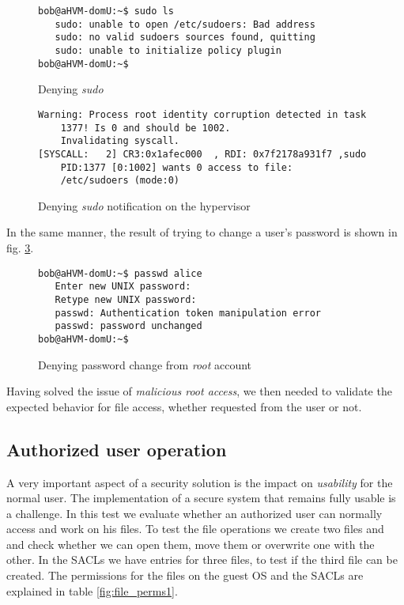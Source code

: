 \begin{figure}[ht]
	\centering
	\footnotesize{\selectfont 
		\begin{lstlisting}
bob@aHVM-domU:~$ sudo ls
   sudo: unable to open /etc/sudoers: Bad address
   sudo: no valid sudoers sources found, quitting
   sudo: unable to initialize policy plugin
bob@aHVM-domU:~$
		\end{lstlisting}}
	\caption{Denying \emph{sudo}}
	\label{fig:sudo_deny}
\end{figure}

\begin{figure}[ht]
	\centering
	\footnotesize{\selectfont 
		\begin{lstlisting}
Warning: Process root identity corruption detected in task 
	1377! Is 0 and should be 1002. 
	Invalidating syscall.
[SYSCALL:   2] CR3:0x1afec000  , RDI: 0x7f2178a931f7 ,sudo 
	PID:1377 [0:1002] wants 0 access to file: 
	/etc/sudoers (mode:0)
		\end{lstlisting}}
	\caption{Denying \emph{sudo} notification on the hypervisor}
	\label{fig:sudo_deny_not}
\end{figure}

\par In the same manner, the result of trying to change a user's password is shown in fig. \ref{fig:passwd_deny}.

\begin{figure}[ht]
	\centering
	\footnotesize{\selectfont 
		\begin{lstlisting}
bob@aHVM-domU:~$ passwd alice
   Enter new UNIX password:
   Retype new UNIX password:
   passwd: Authentication token manipulation error
   passwd: password unchanged
bob@aHVM-domU:~$
		\end{lstlisting}}
	\caption{Denying password change from \emph{root} account}
	\label{fig:passwd_deny}
\end{figure}


\par Having solved the issue of \emph{malicious root access}, we then needed to validate the expected behavior for file access, whether requested from the  user or not.

\subsection{Authorized user operation}

\par A very important aspect of a security solution is the impact on \emph{usability} for the normal user. The implementation of a secure system that remains fully usable is a challenge. In this test we evaluate whether an authorized user can normally access and work on his files. To test the file operations we create two files  and  and check whether we can open them, move them or overwrite one with the other. In the \acp{SACL} we have entries for three files, to test if the third file can be created. The permissions for the files on the guest \ac{OS} and the \acp{SACL} are explained in table \ref{fig:file_perms1}.

